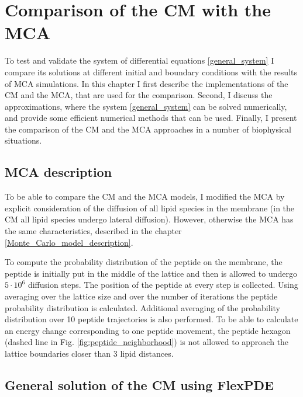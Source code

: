 \chapter{Comparison of the CM with the MCA}

\label{comparison_chapter}

To test and validate the system of differential equations \eqref{general_system} I compare its solutions at different initial and boundary conditions with the results of MCA simulations. In this chapter I first describe the implementations of the CM and the MCA, that are used for the comparison. Second, I discuss the approximations, where the system \eqref{general_system} can be solved numerically, and provide some efficient numerical methods that can be used. Finally, I present the comparison of the CM and the MCA approaches in a number of biophysical situations.

\section{MCA description}

\label{new_MCA_description}

To be able to compare the CM and the MCA models, I modified the MCA by explicit consideration of the diffusion of all lipid species in the membrane (in the CM all lipid species undergo lateral diffusion). However, otherwise the MCA has the same characteristics, described in the chapter \ref{Monte_Carlo_model_description}.

To compute the probability distribution of the peptide on the membrane, the peptide is initially put in the middle of the lattice and then is allowed to undergo $5\cdot10^6$ diffusion steps. The position of the peptide at every step is collected. Using averaging over the lattice size and over the number of iterations the peptide probability distribution is calculated. Additional averaging of the probability distribution over 10 peptide trajectories is also performed. To be able to calculate an energy change corresponding to one peptide movement, the peptide hexagon (dashed line in Fig. \ref{fig:peptide_neighborhood}) is not allowed to approach the lattice boundaries closer than 3 lipid distances.

\section{General solution of the CM using FlexPDE}

\label{FlexPDE_description}


